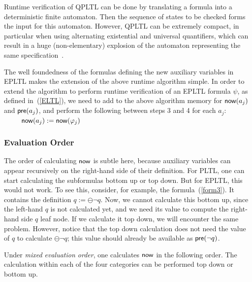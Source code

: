 \noindent
Runtime verification of QPLTL can be done by translating a
formula into a deterministic finite automaton. Then the sequence of states to be checked forms the input for this automaton. 
However, QPLTL can be extremely compact, in particular when using alternating existential and universal 
quantifiers, which can result in a huge (non-elementary) explosion of
the automaton representing the same
specification~\cite{Thomas}.

The well foundedness of the formulas defining the new auxiliary variables in EPLTL makes the extension of the above
runtime algorithm simple.
In order to extend the algorithm to perform runtime verification of an EPLTL formula $\psi$, as defined in~(\ref{ELTL}),  we need to  add to the above
algorithm memory for $\mathsf{now} ( a_j )$ and $\mathsf{pre} ( a_j )$,
and perform the following between steps 3 and 4 for each $a_j$: \\

\ \ \ \ \ $\mathsf{now} ( a_j ) := \mathsf{now} ( \varphi_j )$ \\

\subsubsection{Evaluation Order} 

The order of calculating $\mathsf{now}$ is subtle here, because
auxiliary variables can appear recursively on the right-hand 
side of their definition. For PLTL, one can start calculating the subformulas
bottom up or top down. But for EPLTL, this would not work. To see this, consider, for example, the formula~(\ref{form3}). It contains
the definition $q := \ominus \neg q$. Now, we cannot calculate this
bottom up, since the left-hand $q$ is not calculated yet, and we need its value to compute the right-hand side $q$ leaf node.
If we calculate it top down, we will encounter the same problem.
However, notice that the top down calculation does not need the
value of $q$ to calculate $\ominus \neg q$; this value should already be available as $\mathsf{pre} ( \neg q )$.


Under {\em mixed evaluation order}, one calculates $\mathsf{now}$ in the following order. The calculation within each of the four categories can be performed top down or bottom up.

